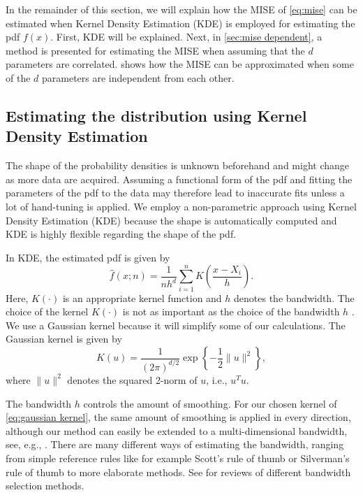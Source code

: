 In the remainder of this section, we will explain how the MISE of \cref{eq:mise} can be estimated when Kernel Density Estimation (KDE) is employed for estimating the pdf $f(x)$. First, KDE will be explained. Next, in \cref{sec:mise dependent}, a method is presented for estimating the MISE when assuming that the $d$ parameters are correlated.  shows how the MISE can be approximated when some of the $d$ parameters are independent from each other.

\subsection{Estimating the distribution using Kernel Density Estimation}
\label{sec:kde}

The shape of the probability densities is unknown beforehand and might change as more data are acquired. Assuming a functional form of the pdf and fitting the parameters of the pdf to the data may therefore lead to inaccurate fits unless a lot of hand-tuning is applied. We employ a non-parametric approach using Kernel Density Estimation (KDE) \cite{rosenblatt1956remarks, parzen1962estimation} because the shape is automatically computed and KDE is highly flexible regarding the shape of the pdf.

In KDE, the estimated pdf is given by
\begin{equation}
	\label{eq:kde}
	\hat{f}(x;n) = \frac{1}{nh^d} \sum_{i=1}^n K\left(\frac{x - X_i}{h}\right).
\end{equation}
Here, $K(\cdot)$ is an appropriate kernel function and $h$ denotes the bandwidth. The choice of the kernel $K(\cdot)$ is not as important as the choice of the bandwidth $h$ \cite{turlach1993bandwidthselection}. We use a Gaussian kernel because it will simplify some of our calculations. The Gaussian kernel is given by
\begin{equation}
	\label{eq:gaussian kernel}
	K(u) = \frac{1}{\left( 2\pi \right)^{d/2}} \exp \left\{ -\frac{1}{2} \|u\|^2 \right\},
\end{equation}
where $\|u\|^2$ denotes the squared 2-norm of $u$, i.e., $u^T u$.

The bandwidth $h$ controls the amount of smoothing. For our chosen kernel of \cref{eq:gaussian kernel}, the same amount of smoothing is applied in every direction, although our method can easily be extended to a multi-dimensional bandwidth, see, e.g., \textcite{scott2005multidimensional, chen2017tutorial}. There are many different ways of estimating the bandwidth, ranging from simple reference rules like for example Scott's rule of thumb \cite{scott2015multivariate} or Silverman's rule of thumb \cite{silverman1986density} to more elaborate methods. See \textcite{turlach1993bandwidthselection, bashtannyk2001bandwidth, jones1996brief, chiu1996comparative} for reviews of different bandwidth selection methods. 

